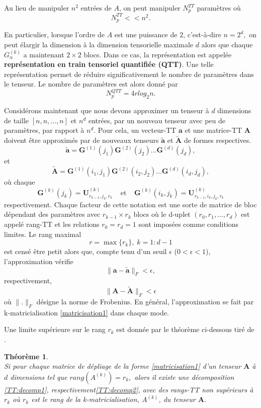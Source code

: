 \documentclass[11pt,a4paper,oneside]{book}
\newtheorem{theo}{Théorème}[chapter]
\def\G{\mathfrak G}
\def\G{\mathbf G}
\newcommand{\mbf}[1]{\mathbf{#1}}
\begin{document}
 Au lieu de manipuler $n^2$ entrées de $ A $, on peut manipuler $N_p^{TT}$ paramètres où
$$N_p^{TT} << n^2.$$

En particulier, lorsque l'ordre de $ A $ est une puissance de $ 2 $, c'est-à-dire $n = 2^d,$ on peut élargir la dimension à la dimension tensorielle maximale $ d $ alors que chaque $G_{\alpha}^{(k)}$ a maintenant $2 \times 2$ blocs. Dans ce cas, la représentation est appelée \textbf{représentation en train tensoriel quantifiée (QTT)}. Une telle représentation permet de réduire significativement le nombre de paramètres dans le tenseur. Le nombre de paramètres est alors donné  par
\begin{equation}
N_p^{QTT} = 4rlog_2n.
\end{equation}

Considérons maintenant que nous devons approximer un tenseur à $ d $ dimensions de taille $[n,n,\ldots,n]$ et $n^d$ entrées, par un nouveau tenseur avec peu de paramètres, par rapport à $n^d$. Pour cela, un vecteur-TT $\mbf{a}$ et une matrice-TT $\mathbf{A}$ doivent être approximés par de nouveaux tenseurs $\tilde{\mathbf{a}}$ et $\tilde{\mathbf{A}}$ de formes respectives. 
\begin{equation}
\label{TT:decomp1}
\tilde{\mathbf{a}} = \G^{(1)}(j_1)\G^{(2)}(j_2)\ldots \G^{(d)}(j_d),
\end{equation}
et
\begin{equation}
\label{TT:decomp2}
\tilde{\mathbf{A}} = \G^{(1)}(i_1,j_1)\G^{(2)}(i_2,j_2)\ldots \G^{(d)}(i_d,j_d),
\end{equation} 
où chaque
 $$\G^{(k)}(j_k) = \mbf{U}_{r_{k-1},j_k,r_k}^{(k)}\;\;\;\; \text{et}\;\;\;\; \G^{(k)}(i_k,j_k) = \mbf{U}_{r_{k-1},i_k,j_k,r_k}^{(k)}$$
respectivement. Chaque facteur de cette notation est une sorte de matrice de bloc dépendant des paramètres avec $r_{k-1}\times r_{k}$ blocs où le d-uplet $(r_0,r_1,\ldots,r_d)$ est appelé rang-TT et les relations $r_0 = r_d = 1$ sont imposées comme conditions limites. Le rang maximal
$$r = \max\{r_k\},\; k = 1:d-1$$
est censé être petit alors que, compte tenu d'un seuil $\epsilon$ ($0 < \epsilon < 1$), l'approximation vérifie $$\|\mbf{a}-\tilde{\mathbf{a}}\|_{F} < \epsilon, $$respectivement,
$$\|\mbf{A}-\tilde{\mathbf{A}}\|_{F}< \epsilon$$
où $\|.\|_{F}$ désigne la norme de Frobenius. En général, l'approximation se fait par k-matricialisation \eqref{matricisation1} dans chaque mode.

Une limite supérieure sur le rang $ r_{k} $ est donnée par le théorème ci-dessous tiré de \cite[p.145]{Nyenyezi2018}.
\begin{theo}
\emph{\\}
Si pour chaque matrice de dépliage de la forme \eqref{matricisation1} d'un tenseur $\mathbf{A}$ à $ d $ dimensions tel que $rang(A^{(k)}) = r_k,$ alors il existe une décomposition \eqref{TT:decomp1},  respectivement\eqref{TT:decomp2}, avec des rangs-TT non supérieurs à $r_k$ où $r_k$ est le rang de la k-matricialisation, $A^{(k)}$, du tenseur $\mathbf{A}$.
\end{theo}
 
\end{document}
